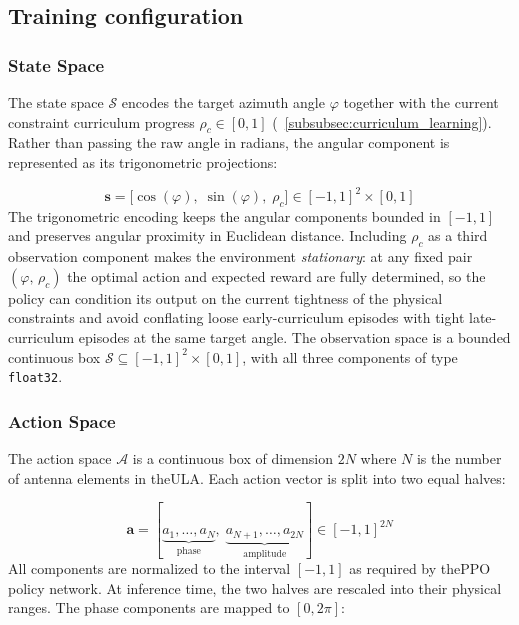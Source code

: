 \subsection{Training configuration}

\subsubsection{State Space}

The state space $\mathcal{S}$ encodes the target azimuth angle $\varphi$ together with the current constraint curriculum progress $\rho_c \in [0,1]$ (\subsubsectionname~\ref{subsubsec:curriculum_learning}). Rather than passing the raw angle in radians, the angular component is represented as its trigonometric projections:

\begin{equation}
    \mathbf{s} = \bigl[\cos(\varphi),\; \sin(\varphi),\; \rho_c\bigr] \in [-1, 1]^2 \times [0, 1]
\end{equation}
The trigonometric encoding keeps the angular components bounded in $[-1, 1]$ and preserves angular proximity in Euclidean distance. Including $\rho_c$ as a third observation component makes the environment \emph{stationary}: at any fixed pair $(\varphi,\,\rho_c)$ the optimal action and expected reward are fully determined, so the policy can condition its output on the current tightness of the physical constraints and avoid conflating loose early-curriculum episodes with tight late-curriculum episodes at the same target angle. The observation space is a bounded continuous box $\mathcal{S} \subseteq [-1,1]^2 \times [0,1]$, with all three components of type \texttt{float32}.

\subsubsection{Action Space}
The action space $\mathcal{A}$ is a continuous box of dimension $2N$ where $N$ is the number of antenna elements in the\gls{ULA}. Each action vector is split into two equal halves:

\begin{equation}
    \mathbf{a} = [\underbrace{a_1, \dots, a_N}_{\text{phase}},\;
    \underbrace{a_{N+1}, \dots, a_{2N}}_{\text{amplitude}}] \in [-1, 1]^{2N}
\end{equation}
All components are normalized to the interval $[-1, 1]$ as required by the\gls{PPO} policy network. At inference time, the two halves are rescaled into their physical ranges. The phase components are mapped to $[0, 2\pi]$:

